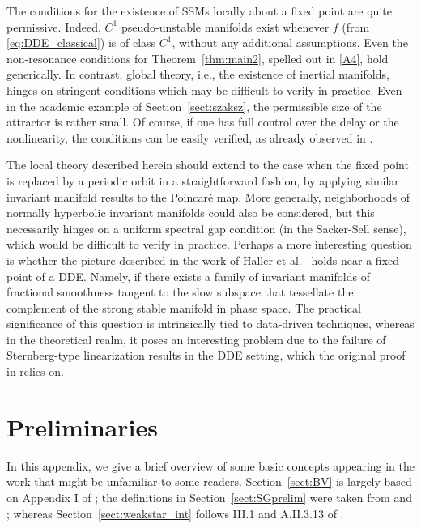 \documentclass[a4paper, 12pt, oneside, reqno, notitlepage]{amsart}
\theoremstyle{plain}
\theoremstyle{definition}
\theoremstyle{remark}
\begin{document}
The conditions for the existence of SSMs locally about a fixed point are quite permissive.
Indeed, $C^1$ pseudo-unstable manifolds exist whenever $f$ (from \eqref{eq:DDE_classical}) is of class $C^1$, without any additional assumptions.  
Even the non-resonance conditions for Theorem~\ref{thm:main2}, spelled out in \ref{A4}, hold generically.
In contrast, global theory, i.e., the existence of inertial manifolds, hinges on stringent conditions which may be difficult to verify in practice.
Even in the academic example of Section~\ref{sect:szaksz}, the permissible size of the attractor is rather small. 
Of course, if one has full control over the delay or the nonlinearity, the conditions can be easily verified, as already observed in \cite{driver1968ryabov}. 



The local theory described herein should extend to the case when the fixed point is replaced by a periodic orbit in a straightforward fashion, by applying similar invariant manifold results to the Poincaré map.
More generally, neighborhoods of normally hyperbolic invariant manifolds could also be considered, but this necessarily hinges on a uniform spectral gap condition (in the Sacker-Sell sense), which would be difficult to verify in practice.
Perhaps a more interesting question is whether the picture described in the work of Haller et al.~\cite{haller2023nonlinear} holds near a fixed point of a DDE.
Namely, if there exists a family of invariant manifolds of fractional smoothness tangent to the slow subspace that tessellate the complement of the strong stable manifold in phase space.
The practical significance of this question is intrinsically tied to data-driven techniques, whereas in the theoretical realm, it poses an interesting problem due to the failure of Sternberg-type linearization results  in the DDE setting, which the original proof in \cite{haller2023nonlinear} relies on.







\appendix
\section{Preliminaries}
\label{sect:prelim}

In this appendix, we give a brief overview of some basic concepts appearing in the work that might be unfamiliar to some readers.
Section~\ref{sect:BV} is largely based on Appendix I of \cite{diekmann2012delay}; 
the definitions in Section~\ref{sect:SGprelim} were taken from \cite{buhler2018functional} and \cite{marsden1976hopf};
whereas Section~\ref{sect:weakstar_int} follows III.1 and A.II.3.13 of \cite{diekmann2012delay}.
\end{document}
